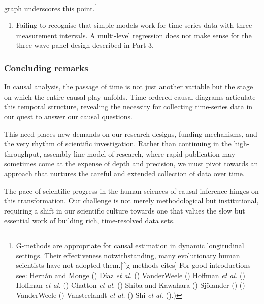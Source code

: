 \documentclass[
  singlecolumn,
  9pt]{article}
\providecommand{\tightlist}{%
  \setlength{\itemsep}{0pt}\setlength{\parskip}{0pt}}\usepackage{longtable,booktabs,array}
\begin{document}
\begin{enumerate}
  graph underscores this point.\footnote{G-methods are appropriate for
    causal estimation in dynamic longitudinal settings. Their
    effectiveness notwithstanding, many evolutionary human scientists
    have not adopted them.{[}\^{}g-methods-cites{]} For good
    introductions see: Hernán and Monge
    () Díaz \emph{et al.}
    () VanderWeele
    () Hoffman \emph{et al.}
    () Hoffman \emph{et al.}
    () Chatton \emph{et al.}
    () Shiba and Kawahara
    () Sjölander
    ()
    () VanderWeele
    () Vansteelandt \emph{et al.}
    () Shi \emph{et al.}
    ().)}
\end{enumerate}

\begin{enumerate}
\def\labelenumi{\arabic{enumi}.}
\setcounter{enumi}{11}
\tightlist
\item
  Failing to recognise that simple models work for time series data with
  three measurement intervals. A multi-level regression does not make
  sense for the three-wave panel design described in Part 3.
\end{enumerate}

\subsubsection{Concluding remarks}\label{concluding-remarks}

In causal analysis, the passage of time is not just another variable but
the stage on which the entire causal play unfolds. Time-ordered causal
diagrams articulate this temporal structure, revealing the necessity for
collecting time-series data in our quest to answer our causal questions.

This need places new demands on our research designs, funding
mechanisms, and the very rhythm of scientific investigation. Rather than
continuing in the high-throughput, assembly-line model of research,
where rapid publication may sometimes come at the expense of depth and
precision, we must pivot towards an approach that nurtures the careful
and extended collection of data over time.

The pace of scientific progress in the human sciences of causal
inference hinges on this transformation. Our challenge is not merely
methodological but institutional, requiring a shift in our scientific
culture towards one that values the slow but essential work of building
rich, time-resolved data sets.
\end{document}
